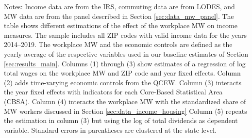 \begin{table}[hbt!]
    \begin{minipage}{.95\textwidth} \footnotesize
        \vspace{2mm}
        Notes: 
        Income data are from the IRS, commuting data are from LODES, and MW
        data are from the panel described in Section \ref{sec:data_mw_panel}.
        The table shows different estimations of the effect of the workplace MW
        on income measures.
        The sample includes all ZIP codes with valid income data for the years 
        2014--2019.
        The workplace MW and the economic controls are defined as the yearly 
        average of the respective variables used in our baseline estimates of 
        Section \ref{sec:results_main}.
        Columns (1) through (3) show estimates of a regression of log total wages
        on the workplace MW and ZIP code and year fixed effects.
        Column (2) adds time-varying economic controls from the QCEW.
        Column (3) interacts the year fixed effects with indicators for each
        Core-Based Statistical Area (CBSA).
        Column (4) interacts the workplace MW with the standardized share of MW 
        workers discussed in Section \ref{sec:data_income_housing}
        Column (5) repeats the estimation in column (3) but using the log of 
        total dividends as dependent variable.
        Standard errors in parentheses are clustered at the state level.
    \end{minipage}
\end{table}

